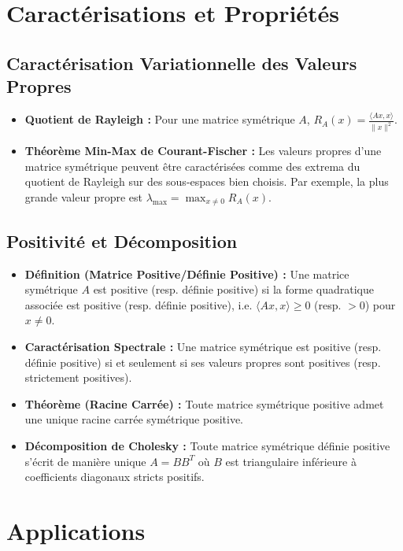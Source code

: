\documentclass[12pt, a4paper, parskip=full]{report}
\theoremstyle{agregstyle}
\begin{document}
\section{Caractérisations et Propriétés}

\subsection{Caractérisation Variationnelle des Valeurs Propres}
\begin{itemize}
    \item \textbf{Quotient de Rayleigh :} Pour une matrice symétrique $A$, $R_A(x) = \frac{\langle Ax, x \rangle}{\|x\|^2}$.
    \item \textbf{Théorème Min-Max de Courant-Fischer :} Les valeurs propres d'une matrice symétrique peuvent être caractérisées comme des extrema du quotient de Rayleigh sur des sous-espaces bien choisis. Par exemple, la plus grande valeur propre est $\lambda_{\max} = \max_{x \neq 0} R_A(x)$.
\end{itemize}

\subsection{Positivité et Décomposition}
\begin{itemize}
    \item \textbf{Définition (Matrice Positive/Définie Positive) :} Une matrice symétrique $A$ est positive (resp. définie positive) si la forme quadratique associée est positive (resp. définie positive), i.e. $\langle Ax,x \rangle \ge 0$ (resp. $>0$) pour $x \neq 0$.
    \item \textbf{Caractérisation Spectrale :} Une matrice symétrique est positive (resp. définie positive) si et seulement si ses valeurs propres sont positives (resp. strictement positives).
    \item \textbf{Théorème (Racine Carrée) :} Toute matrice symétrique positive admet une unique racine carrée symétrique positive.
    \item \textbf{Décomposition de Cholesky :} Toute matrice symétrique définie positive s'écrit de manière unique $A=B B^T$ où $B$ est triangulaire inférieure à coefficients diagonaux stricts positifs.
\end{itemize}

\section{Applications}
\end{document}
